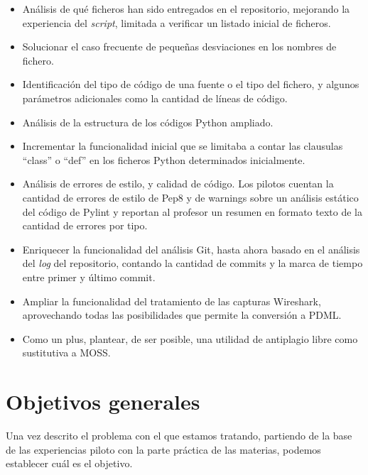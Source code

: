 \begin{itemize}
\item Análisis de qué ficheros han sido entregados en el repositorio, mejorando la experiencia del \textit{script}, limitada a verificar un listado inicial de ficheros.

\item Solucionar el caso frecuente de pequeñas desviaciones en los nombres de fichero.

\item Identificación del tipo de código de una fuente o el tipo del fichero, y algunos 	parámetros adicionales como la cantidad de líneas de código.

\item Análisis de la estructura de los códigos Python ampliado.

\item Incrementar la funcionalidad inicial que se limitaba a contar las clausulas ``class'' o ``def'' en los ficheros Python determinados inicialmente.

\item Análisis de errores de estilo, y calidad de código. Los pilotos cuentan la cantidad de errores de estilo de Pep8 y de warnings sobre un análisis estático del código de Pylint y reportan al profesor un resumen en formato texto de la cantidad de errores por tipo.

\item Enriquecer la funcionalidad del análisis Git, hasta ahora basado en el análisis del \textit{log} del repositorio, contando la cantidad de commits y la marca de tiempo entre primer y último commit.

\item Ampliar la funcionalidad del tratamiento de las capturas Wireshark, aprovechando todas las posibilidades que permite la conversión a PDML.

\item Como un plus, plantear, de ser posible, una utilidad de antiplagio libre como sustitutiva a MOSS.
\end{itemize}


\section{Objetivos generales}
\label{sec:obj_gen}


Una vez descrito el problema con el que estamos tratando, partiendo de la base de las experiencias piloto con la parte práctica de las materias, podemos establecer cuál es el objetivo.\\


